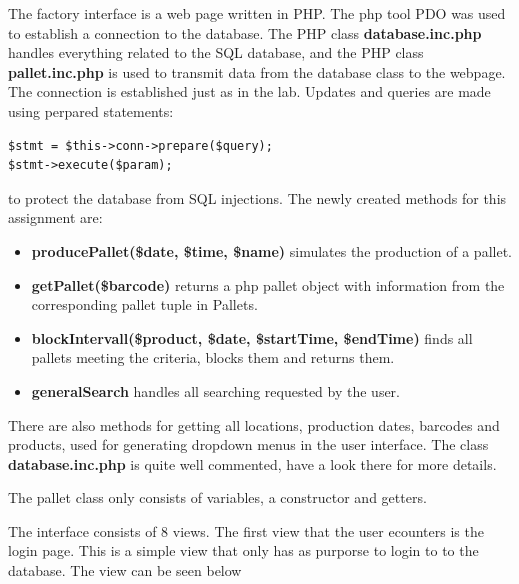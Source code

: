 \documentclass[a4paper]{scrartcl}
\numberwithin{equation}{section}
\begin{document}
The factory interface is a web page written in PHP. 
The php tool PDO was used to establish a connection to the database. 
The PHP class \textbf{database.inc.php} handles everything related to the SQL database, and the PHP class \textbf{pallet.inc.php} is used to transmit data from the database class to the webpage.
The connection is established just as in the lab.
Updates and queries are made using perpared statements:
\begin{verbatim}
$stmt = $this->conn->prepare($query);
$stmt->execute($param);
\end{verbatim}
to protect the database from SQL injections. 
The newly created methods for this assignment are:
\begin{itemize}
  \item \textbf{producePallet(\$date, \$time, \$name)} simulates the production of a pallet.
  \item \textbf{getPallet(\$barcode)} returns a php pallet object with information from the corresponding pallet tuple in Pallets.
  \item \textbf{blockIntervall(\$product, \$date, \$startTime, \$endTime)} finds all pallets meeting the criteria, blocks them and returns them.
  \item \textbf{generalSearch} handles all searching requested by the user.
\end{itemize}
There are also methods for getting all locations, production dates, barcodes and products, used for generating dropdown menus in the user interface. 
The class \textbf{database.inc.php} is quite well commented, have a look there for more details.

The pallet class only consists of variables, a constructor and getters.



The interface consists of 8 views. The first view that the user ecounters is the login page. This is a simple view that only has as purporse to login to to the database. The view can be seen below 
\end{document}
